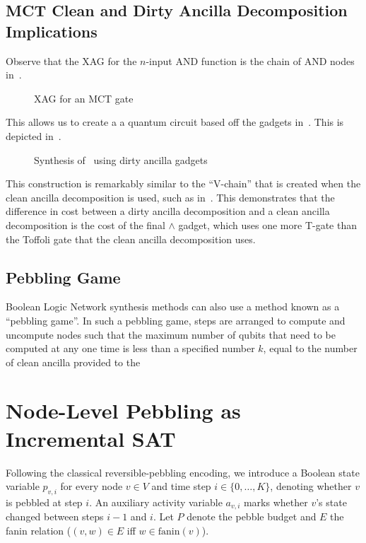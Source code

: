 \subsection{MCT Clean and Dirty Ancilla Decomposition Implications}

Observe that the XAG for the $n$-input AND function is the chain of AND nodes in~.

\begin{figure}[t]
  \centering
  \scalebox{1.0} {
    
  }
  \caption{XAG for an MCT gate}
  \label{fig-mct-xag}
\end{figure}

This allows us to create a a quantum circuit based off the gadgets in~. This is depicted
in~.

\begin{figure}[t]
  \centering
  \scalebox{1.0} {
    
  }
  \caption{Synthesis of~ using dirty ancilla gadgets}
  \label{fig-mct-gadgets}
\end{figure}

This construction is remarkably similar to the ``V-chain'' that is created when the clean ancilla
decomposition is used, such as in~. This demonstrates that the difference in
cost between a dirty ancilla decomposition and a clean ancilla decomposition is the cost of the
final $\wedge$ gadget, which uses one more T-gate than the Toffoli gate that the clean ancilla
decomposition uses.

\subsection{Pebbling Game}

Boolean Logic Network synthesis methods can also use a method known as a ``pebbling game''.
In such a pebbling game, steps are arranged to compute and uncompute nodes such that the
maximum number of qubits that need to be computed at any one time is less than a specified
number $k$, equal to the number of clean ancilla provided to the

\section{Node-Level Pebbling as Incremental SAT}

Following the classical reversible-pebbling encoding, we introduce a
Boolean state variable $p_{v,i}$ for every node $v \in V$ and time
step $i \in \{0,\dots,K\}$, denoting whether $v$ is pebbled at step
$i$. An auxiliary activity variable $a_{v,i}$ marks whether $v$'s
state changed between steps $i-1$ and $i$. Let $P$ denote the pebble
budget and $E$ the fanin relation ($(v,w) \in E$ iff
$w \in \mathrm{fanin}(v)$).

